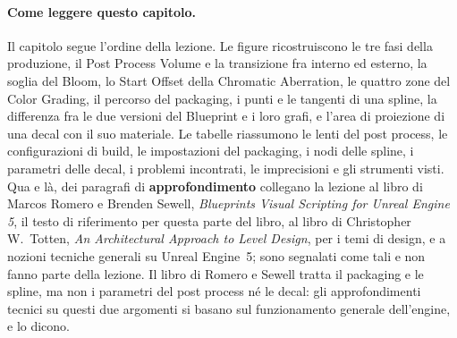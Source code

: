 \paragraph{Come leggere questo capitolo.} Il capitolo segue l'ordine della lezione. Le
figure ricostruiscono le tre fasi della produzione, il Post Process Volume e la transizione
fra interno ed esterno, la soglia del Bloom, lo Start Offset della Chromatic Aberration, le
quattro zone del Color Grading, il percorso del packaging, i punti e le tangenti di una
spline, la differenza fra le due versioni del Blueprint e i loro grafi, e l'area di
proiezione di una decal con il suo materiale. Le tabelle riassumono le lenti del post
process, le configurazioni di build, le impostazioni del packaging, i nodi delle spline, i
parametri delle decal, i problemi incontrati, le imprecisioni e gli strumenti visti. Qua e
là, dei paragrafi di \textbf{approfondimento} collegano la lezione al libro di Marcos Romero
e Brenden Sewell, \emph{Blueprints Visual Scripting for Unreal Engine 5}, il testo di
riferimento per questa parte del libro, al libro di Christopher W.\ Totten, \emph{An
Architectural Approach to Level Design}, per i temi di design, e a nozioni tecniche generali
su Unreal Engine~5; sono segnalati come tali e non fanno parte della lezione. Il libro di
Romero e Sewell tratta il packaging e le spline, ma non i parametri del post process né le
decal: gli approfondimenti tecnici su questi due argomenti si basano sul funzionamento
generale dell'engine, e lo dicono.

